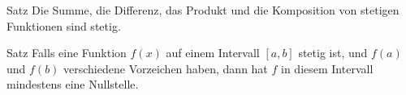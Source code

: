 \begin{definition}{Satz}
    Die Summe, die Differenz, das Produkt und die Komposition von stetigen Funktionen sind stetig.
\end{definition}

\begin{definition}{Satz}
    Falls eine Funktion $f(x)$ auf einem Intervall $\left[a,b\right]$ stetig ist, und $f(a)$ und $f(b)$ verschiedene Vorzeichen haben, dann hat $f$ in diesem Intervall mindestens eine Nullstelle.
\end{definition}